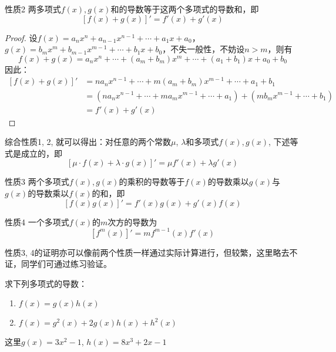 \begin{blk}{性质2}
    两多项式$f(x),g(x)$和的导数等于这两个多项式的导数和，即
\[[f (x) +g (x) ]'=f' (x) +g' (x) \]  
\end{blk}  
 
\begin{proof}
设$f(x)=a_nx^n+a_{n-1}x^{n-1}+\cdots+a_1x+a_0$，$g(x)=b_mx^m+b_{m-1}x^{m-1}+\cdots+b_1x+b_0$，不失一般性，不妨设$n>m$，则有
\[f(x)+g(x)=a_nx^n+\cdots + (a_{m}+b_m)x^{m}+\cdots+(a_1+b_1)x+a_0+b_0\]
因此：
\[\begin{split}
    [f(x)+g(x)]'&=na_nx^{n-1}+\cdots + m(a_{m}+b_m)x^{m-1}+\cdots+a_1+b_1\\
    &=(na_nx^{n-1}+\cdots+ma_mx^{m-1}+\cdots +a_1)+(mb_mx^{m-1}+\cdots +b_1)\\
    &=f'(x)+g'(x)
\end{split}\]
\end{proof}  

综合性质1, 2, 就可以得出：对任意的两个常数$\mu$, $\lambda$和多项式$f(x),g(x)$, 下述等式是成立的，即
\[[\mu\cdot f (x) +\lambda\cdot g (x) ]'=\mu f' (x) +\lambda g' (x) \]

\begin{blk}{性质3}
两个多项式$f(x),g(x)$的乘积的导数等于$f(x)$的导数乘以$g(x)$与$g(x)$的导数乘以$f(x)$的和，即
\[[f (x) g (x) ]'=f' (x) g (x) +g' (x) f (x) \]
\end{blk}

\begin{blk}{性质4}
    一个多项式$f(x)$的$m$次方的导数为
\[[f^m (x) ] '= mf^{m-1} (x) f' (x) \]
\end{blk}

性质3, 4的证明亦可以像前两个性质一样通过实际计算进行，但较繁，这里略去不证，同学们可通过练习验证。

\begin{example}
求下列多项式的导数：
\begin{enumerate}
    \item $f(x)=g(x)h(x)$
    \item $f (x) =g^2 (x) +2g (x) h (x) +h^2 (x) $
\end{enumerate} 
这里$g(x)=3x^2-1$, $h (x) =8x^3+2x-1$
    \end{example}


